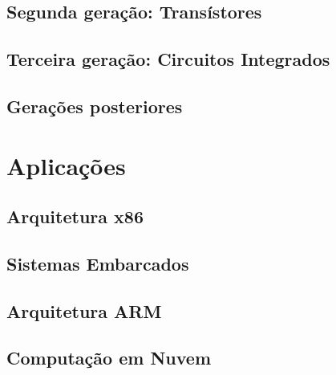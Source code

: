 \documentclass{article}
\begin{document}
\subsection{Segunda geração: Transístores}
\subsection{Terceira geração: Circuitos Integrados}
\subsection{Gerações posteriores}

\section{Aplicações} 
\subsection{Arquitetura x86} 
\subsection{Sistemas Embarcados}
\subsection{Arquitetura ARM} 
\subsection{Computação em Nuvem}
\end{document}
